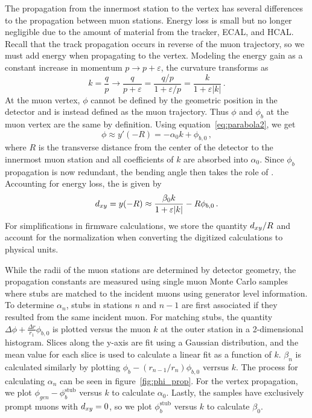 The propagation from the innermost station to the vertex has several differences to the propagation between muon stations. Energy loss is small but no longer negligible due to the amount of material from the tracker, ECAL, and HCAL. Recall that the track propagation occurs in reverse of the muon trajectory, so we must add energy when propagating to the vertex. Modeling the energy gain as a constant increase in momentum $p\to p+\varepsilon$, the curvature transforms as
\begin{equation}
	\label{eq:energygain}
	k=\frac{q}{p}\to\frac{q}{p+\varepsilon}=\frac{q/p}{1+\varepsilon/p}=\frac{k}{1+\varepsilon|k|}\,.
\end{equation}
At the muon vertex, $\phi$ cannot be defined by the geometric position in the detector and is instead defined as the muon trajectory. Thus $\phi$ and $\phi_b$ at the muon vertex are the same by definition. Using equation~\ref{eq:parabola2}, we get
\begin{equation}
	\label{eq:vertex_phi}
	\phi\approx y'(-R)=-\alpha_0k+\phi_{b,0}\,,
\end{equation}
where $R$ is the transverse distance from the center of the detector to the innermost muon station and all coefficients of $k$ are absorbed into $\alpha_0$. Since $\phi_b$ propagation is now redundant, the bending angle then takes the role of \dxy. Accounting for energy loss, the \dxy is given by
\begin{equation}
	\label{eq:vertex_dxy}
	d_{xy}=y(-R)\approx \frac{\beta_0k}{1+\varepsilon|k|}-R\phi_{b,0}\,.
\end{equation}
For simplifications in firmware calculations, we store the quantity $d_{xy}/R$ and account for the normalization when converting the digitized calculations to physical units.

While the radii of the muon stations are determined by detector geometry, the propagation constants  are measured using single muon Monte Carlo samples where stubs are matched to the incident muons using generator level information. To determine $\alpha_n$, stubs in stations $n$ and $n-1$ are first associated if they resulted from the same incident muon. For matching stubs, the quantity $\Delta\phi+\frac{\Delta r}{r_1}\phi_{b,0}$ is plotted versus the muon $k$ at the outer station in a 2-dimensional histogram. Slices along the y-axis are fit using a Gaussian distribution, and the mean value for each slice is used to calculate a linear fit as a function of $k$. $\beta_n$ is calculated similarly by plotting $\phi_b-\left(r_{n-1}/r_n\right)\phi_{b,0}$ verrsus $k$. The process for calculating $\alpha_n$ can be seen in figure~\ref{fig:phi_prop}. For the vertex propagation, we plot $\phi_{gen}-\phi_b^\text{stub}$ versus $k$ to calculate $\alpha_0$. Lastly, the samples have exclusively prompt muons with $d_{xy}=0$, so we plot $\phi_b^\text{stub}$ versus $k$ to calculate $\beta_0$.

